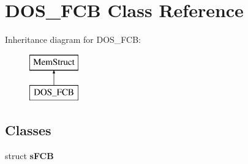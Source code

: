 \hypertarget{classDOS__FCB}{\section{D\-O\-S\-\_\-\-F\-C\-B Class Reference}
\label{classDOS__FCB}
}
Inheritance diagram for D\-O\-S\-\_\-\-F\-C\-B\-:\begin{figure}[H]
\begin{center}
\leavevmode
\includegraphics[height=2.000000cm]{classDOS__FCB}
\end{center}
\end{figure}
\subsection*{Classes}
\begin{DoxyCompactItemize}
\item 
struct {\bfseries s\-F\-C\-B}
\end{DoxyCompactItemize}
